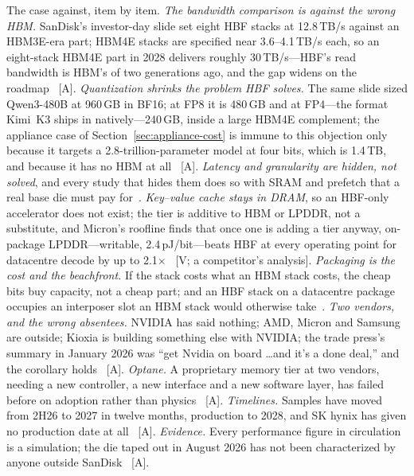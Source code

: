The case against, item by item. \emph{The bandwidth comparison is against the wrong HBM.} SanDisk's investor-day slide set eight HBF stacks at 12.8\,TB/s against an HBM3E-era part; HBM4E stacks are specified near 3.6--4.1\,TB/s each, so an eight-stack HBM4E part in 2028 delivers roughly 30\,TB/s---HBF's read bandwidth is HBM's of two generations ago, and the gap widens on the roadmap~\cite{hbf-xeno,hbf-spectrum} [A]. \emph{Quantization shrinks the problem HBF solves.} The same slide sized Qwen3-480B at 960\,GB in BF16; at FP8 it is 480\,GB and at FP4---the format Kimi~K3 ships in natively---240\,GB, inside a large HBM4E complement; the appliance case of Section~\ref{sec:appliance-cost} is immune to this objection only because it targets a 2.8-trillion-parameter model at four bits, which is 1.4\,TB, and because it has no HBM at all~\cite{hbf-xeno} [A]. \emph{Latency and granularity are hidden, not solved}, and every study that hides them does so with SRAM and prefetch that a real base die must pay for~\cite{hbf-h3,hbf-flashaccel}. \emph{Key--value cache stays in DRAM}, so an HBF-only accelerator does not exist; the tier is additive to HBM or LPDDR, not a substitute, and Micron's roofline finds that once one is adding a tier anyway, on-package LPDDR---writable, 2.4\,pJ/bit---beats HBF at every operating point for datacentre decode by up to 2.1$\times$~\cite{hbf-micron-hotinfra} [V; a competitor's analysis]. \emph{Packaging is the cost and the beachfront.} If the stack costs what an HBM stack costs, the cheap bits buy capacity, not a cheap part; and an HBF stack on a datacentre package occupies an interposer slot an HBM stack would otherwise take~\cite{hbf-analysis}. \emph{Two vendors, and the wrong absentees.} NVIDIA has said nothing; AMD, Micron and Samsung are outside; Kioxia is building something else with NVIDIA; the trade press's summary in January 2026 was ``get Nvidia on board \ldots and it's a done deal,'' and the corollary holds~\cite{hbf-bf-window,hbf-toms-spec} [A]. \emph{Optane.} A proprietary memory tier at two vendors, needing a new controller, a new interface and a new software layer, has failed before on adoption rather than physics~\cite{hbf-optane-analogy} [A]. \emph{Timelines.} Samples have moved from 2H26 to 2027 in twelve months, production to 2028, and SK hynix has given no production date at all~\cite{hbf-techradar,hbf-tapeout} [A]. \emph{Evidence.} Every performance figure in circulation is a simulation; the die taped out in August 2026 has not been characterized by anyone outside SanDisk~\cite{hbf-tradethepool} [A].

